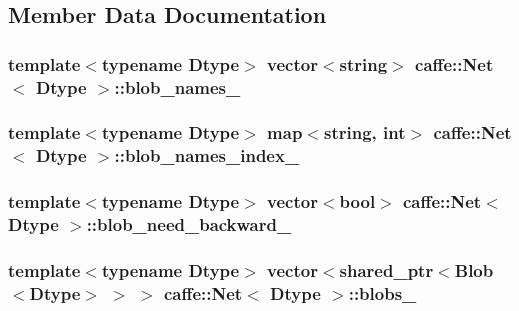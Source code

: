 \subsection{Member Data Documentation}
\hypertarget{classcaffe_1_1_net_a0055d38b35ea1a2f44bd400dd6d10846}{
\subsubsection[{blob\+\_\+names\+\_\+}]{\setlength{\rightskip}{0pt plus 5cm}template$<$typename Dtype$>$ vector$<$string$>$ {\bf caffe\+::\+Net}$<$ Dtype $>$\+::blob\+\_\+names\+\_\+\hspace{0.3cm}{\ttfamily [protected]}}}\label{classcaffe_1_1_net_a0055d38b35ea1a2f44bd400dd6d10846}
\hypertarget{classcaffe_1_1_net_a45f232e36045689438a7e1d869ed399c}{
\subsubsection[{blob\+\_\+names\+\_\+index\+\_\+}]{\setlength{\rightskip}{0pt plus 5cm}template$<$typename Dtype$>$ map$<$string, int$>$ {\bf caffe\+::\+Net}$<$ Dtype $>$\+::blob\+\_\+names\+\_\+index\+\_\+\hspace{0.3cm}{\ttfamily [protected]}}}\label{classcaffe_1_1_net_a45f232e36045689438a7e1d869ed399c}
\hypertarget{classcaffe_1_1_net_a16cedebd7cc82e0b3a30617b71d4c3f7}{
\subsubsection[{blob\+\_\+need\+\_\+backward\+\_\+}]{\setlength{\rightskip}{0pt plus 5cm}template$<$typename Dtype$>$ vector$<$bool$>$ {\bf caffe\+::\+Net}$<$ Dtype $>$\+::blob\+\_\+need\+\_\+backward\+\_\+\hspace{0.3cm}{\ttfamily [protected]}}}\label{classcaffe_1_1_net_a16cedebd7cc82e0b3a30617b71d4c3f7}
\hypertarget{classcaffe_1_1_net_ab033c0574fcbf1e67e22b9682677c64d}{
\subsubsection[{blobs\+\_\+}]{\setlength{\rightskip}{0pt plus 5cm}template$<$typename Dtype$>$ vector$<$shared\+\_\+ptr$<${\bf Blob}$<$Dtype$>$ $>$ $>$ {\bf caffe\+::\+Net}$<$ Dtype $>$\+::blobs\+\_\+\hspace{0.3cm}{\ttfamily [protected]}}}\label{classcaffe_1_1_net_ab033c0574fcbf1e67e22b9682677c64d}
